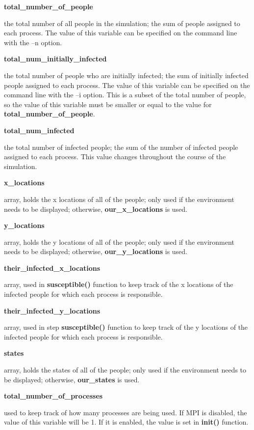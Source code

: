 \documentclass[letterpaper,10pt,openany,oneside]{sphinxmanual}
\begin{document}
\textbf{total\_number\_of\_people}

the total number of all people in the simulation; the sum of people assigned to each process. The value of this variable can be specified on the command line with the –n option.

\textbf{total\_num\_initially\_infected}

the total number of people who are initially infected; the sum of initially infected people assigned to each process. The value of this variable can be specified on the command line with the –i option. This is a subset of the total number of people, so the value of this variable must be smaller or equal to the value for \textbf{total\_number\_of\_people}.

\textbf{total\_num\_infected}

the total number of infected people; the sum of the number of infected people assigned to each process. This value changes throughout the course of the simulation.

\textbf{x\_locations}

array, holds the x locations of all of the people; only used if the environment needs to be displayed; otherwise, \textbf{our\_x\_locations} is used.

\textbf{y\_locations}

array, holds the y locations of all of the people; only used if the environment needs to be displayed; otherwise, \textbf{our\_y\_locations} is used.

\textbf{their\_infected\_x\_locations}

array, used in \textbf{susceptible()} function to keep track of the x locations of the infected people for which each process is responsible.

\textbf{their\_infected\_y\_locations}

array, used in step \textbf{susceptible()} function to keep track of the y locations of the infected people for which each process is responsible.

\textbf{states}

array, holds the states of all of the people; only used if the environment needs to be displayed; otherwise, \textbf{our\_states} is used.

\textbf{total\_number\_of\_processes}

used to keep track of how many processes are being used. If MPI is disabled, the value of this variable will be 1. If it is enabled, the value is set in \textbf{init()} function.
\end{document}
